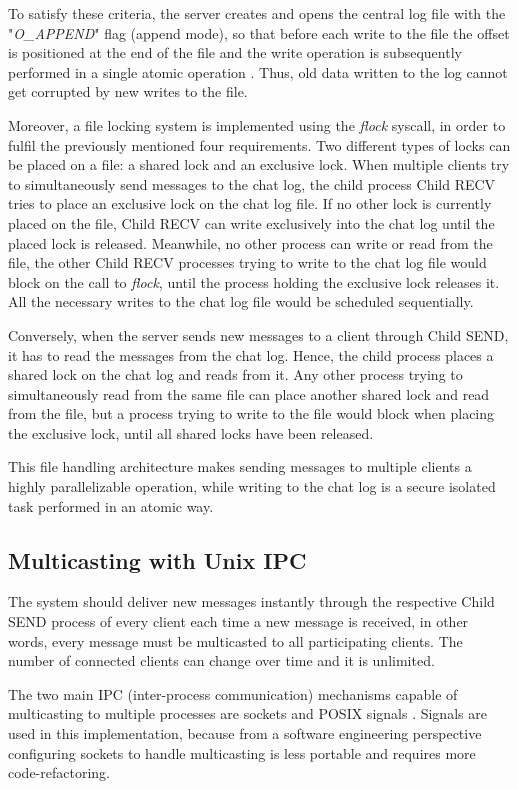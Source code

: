 To satisfy these criteria, the server creates and opens the central log file with the "\textit{O\_APPEND}" flag (append mode), so that before each write to the file the offset is positioned at the end of the file and the write operation is subsequently performed in a single atomic operation \cite{Kerrisk2010}. Thus, old data written to the log cannot get corrupted by new writes to the file.

Moreover, a file locking system is implemented using the \textit{flock} syscall, in order to fulfil the previously mentioned four requirements. Two different types of locks can be placed on a file: a shared lock and an exclusive lock. When multiple clients try to simultaneously send messages to the chat log, the child process Child RECV tries to place an exclusive lock on the chat log file.  If no other lock is currently placed on the file, Child RECV can write exclusively into the chat log until the placed lock is released. Meanwhile, no other process can write or read from the file, the other Child RECV processes trying to write to the chat log file would block on the call to \textit{flock}, until the process holding the exclusive lock releases it. All the necessary writes to the chat log file would be scheduled sequentially.

Conversely, when the server sends new messages to a client through Child SEND, it has to read the messages from the chat log. Hence, the child process places a shared lock on the chat log and reads from it. Any other process trying to simultaneously read from the same file can place another shared lock and read from the file, but a process trying to write to the file would block when placing the exclusive lock, until all shared locks have been released. 

This file handling architecture makes sending messages to multiple clients a highly parallelizable operation, while writing to the chat log is a secure isolated task performed in an atomic way.

\subsection{Multicasting with Unix IPC}
The system should deliver new messages instantly through the respective Child SEND process of every client each time a new message is received, in other words, every message must be multicasted to all participating clients. The number of connected clients can change over time and it is unlimited. 

The two main IPC (inter-process communication) mechanisms capable of multicasting to multiple processes are sockets and POSIX signals \cite{Kerrisk2010}. Signals are used in this implementation, because from a software engineering perspective configuring sockets to handle multicasting is less portable and requires more code-refactoring.

